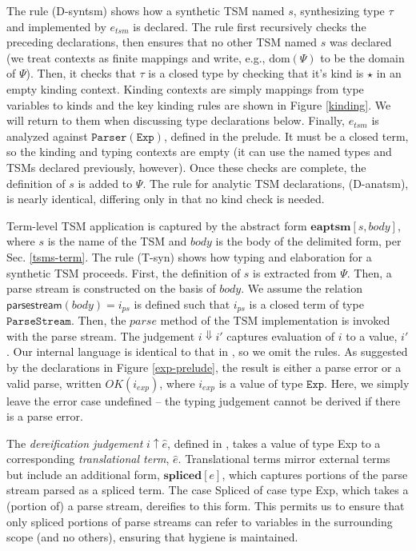 \documentclass{sig-alternate}[10pt]
\makeatletter
\newcommand\BeraMonottfamily{%
  \def\fvm@Scale{0.85}%
  \fontfamily{fvm}\selectfont%
}
\newcommand{\lstinlinew}[1]{{\scriptsize\BeraMonottfamily #1}}
\makeatother
\begin{document}
The rule (D-syntsm) shows how a synthetic TSM named $s$, synthesizing type $\tau$ and implemented by $e_{tsm}$ is declared. The rule first recursively checks the preceding declarations, then ensures that no other TSM named $s$ was declared  (we treat contexts as finite mappings and write, e.g., $\text{dom}(\Psi)$ to be the domain of $\Psi$). Then, it checks that $\tau$ is a closed type by checking that it's kind is $\star$ in an empty kinding context. Kinding contexts are simply mappings from type variables to kinds and the key kinding rules are shown in Figure \ref{kinding}. We will return to them when discussing type declarations below. Finally, $e_{tsm}$ is analyzed against  $\mathtt{Parser}(\mathtt{Exp})$, defined in the prelude. It must be a closed term, so the kinding and typing contexts are empty (it can use the named types and TSMs declared previously, however). Once these checks are complete, the definition of $s$ is added to $\Psi$. The rule for analytic TSM declarations, (D-anatsm), is nearly identical, differing only in that no kind check is needed.

Term-level TSM application is captured by the abstract form $\textbf{eaptsm}[s, body]$, where $s$ is the name of the TSM and $body$ is the body of the delimited form, per Sec. \ref{tsms-term}. The rule (T-syn) shows how typing and elaboration for a synthetic TSM proceeds. First, the definition of $s$ is extracted from $\Psi$. Then, a parse stream is constructed on the basis of $body$. We assume the relation $\textsf{parsestream}(body)=i_{ps}$ is defined such that $i_{ps}$ is a closed term of type $\mathtt{ParseStream}$. Then, the $parse$ method of the TSM implementation is invoked with the parse stream. The judgement $i \Downarrow i'$ captures evaluation of $i$ to a value, $i'$. Our internal language is identical to that in \cite{TSLs}, so we omit the rules. As suggested by the declarations in Figure \ref{exp-prelude}, the result is either a parse error or a valid parse, written $OK(i_{exp})$, where $i_{exp}$ is a value of type $\mathtt{Exp}$. Here, we simply leave the error case undefined -- the typing judgement cannot be derived if there is a parse error.%

The \emph{dereification judgement} $i \uparrow \hat{e}$, defined in \cite{TSLs}, takes a value of type \lstinlinew{Exp} to a corresponding \emph{translational term}, $\hat{e}$. 
Translational terms mirror external terms but include an additional form, $\textbf{spliced}[e]$, which captures portions of the parse stream parsed as a spliced term. The case \lstinlinew{Spliced} of case type \lstinlinew{Exp}, which takes a (portion of) a parse stream, dereifies to this form. This permits us to ensure that only spliced portions of parse streams can refer to variables in the surrounding scope (and no others), ensuring that hygiene is maintained. 
\end{document}
